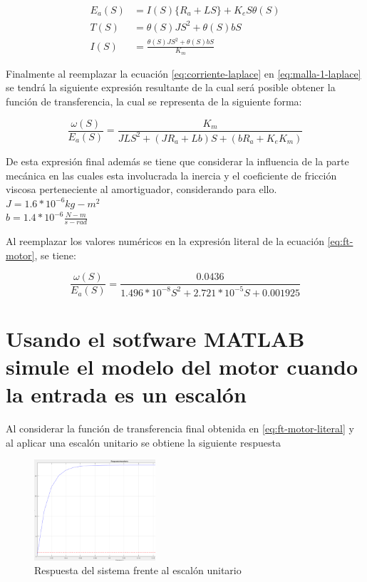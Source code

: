 \documentclass[conference]{IEEEtran}
\begin{document}
	\begin{align}
		E_a(S) &= I(S)\{R_a + LS\} + K_eS\theta(S) \label{eq:malla-1-laplace} \\
		T(S) &= \theta(S)JS^2 + \theta(S)bS \label{eq:torque-laplace} \\
		I(S) &= \frac{\theta(S)JS^2 + \theta(S)bS}{K_m} \label{eq:corriente-laplace}
	\end{align}
	
	Finalmente al reemplazar la ecuación \ref{eq:corriente-laplace} en \ref{eq:malla-1-laplace} se tendrá la siguiente expresión resultante de la cual será posible obtener la función de transferencia, la cual se representa de la siguiente forma:
	
	\begin{equation}
		\frac{\omega(S)}{E_a(S)} = \frac{K_m}{JLS^2 + (JR_a + Lb)S + (bR_a + K_eK_m)}
		\label{eq:ft-motor}
	\end{equation}
	
	De esta expresión final además se tiene que considerar la influencia de la parte mecánica en las cuales esta involucrada la inercia y el coeficiente de fricción viscosa perteneciente al amortiguador, considerando para ello. \\
	
	$J = 1.6*10^{-6} kg-m^2$ \\
	$b = 1.4*10^{-6} \frac{N -m}{s-rad}$
	
	Al reemplazar los valores numéricos en la expresión literal de la ecuación \ref{eq:ft-motor}, se tiene:
	
	\begin{equation}
		\frac{\omega(S)}{E_a(S)} = \frac{0.0436}{1.496*10^{-8}S^2 + 2.721*10^{-5}S + 0.001925}
		\label{eq:ft-motor-literal}
	\end{equation}
	
	\section{Usando el sotfware MATLAB simule el modelo del motor cuando la entrada es un escalón}
	
	Al considerar la función de transferencia final obtenida en \ref{eq:ft-motor-literal} y al aplicar una escalón unitario se obtiene la siguiente respuesta 
	
	\begin{figure}[h]
		\centering
		\includegraphics[width=0.4\textwidth]{media/resp-escalon}
		\caption{Respuesta del sistema frente al escalón unitario}
		\label{fig:resp-escalon}
	\end{figure}
	
\end{document}
